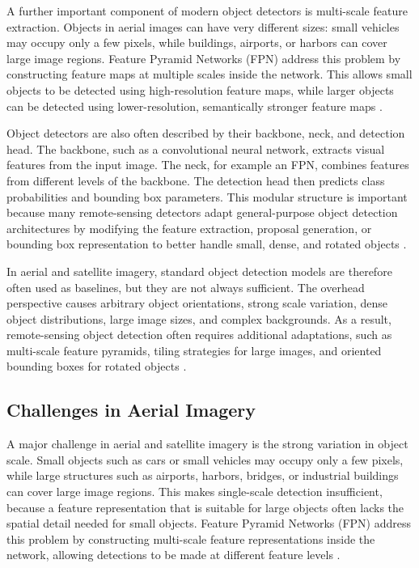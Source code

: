 A further important component of modern object detectors is multi-scale feature extraction. Objects in aerial images can have very different sizes: small vehicles may occupy only a few pixels, while buildings, airports, or harbors can cover large image regions. Feature Pyramid Networks (FPN) address this problem by constructing feature maps at multiple scales inside the network. This allows small objects to be detected using high-resolution feature maps, while larger objects can be detected using lower-resolution, semantically stronger feature maps \cite{lin2017feature,ding2021object}.

Object detectors are also often described by their backbone, neck, and detection head. The backbone, such as a convolutional neural network, extracts visual features from the input image. The neck, for example an FPN, combines features from different levels of the backbone. The detection head then predicts class probabilities and bounding box parameters. This modular structure is important because many remote-sensing detectors adapt general-purpose object detection architectures by modifying the feature extraction, proposal generation, or bounding box representation to better handle small, dense, and rotated objects \cite{li2020object,ding2021object}.

In aerial and satellite imagery, standard object detection models are therefore often used as baselines, but they are not always sufficient. The overhead perspective causes arbitrary object orientations, strong scale variation, dense object distributions, large image sizes, and complex backgrounds. As a result, remote-sensing object detection often requires additional adaptations, such as multi-scale feature pyramids, tiling strategies for large images, and oriented bounding boxes for rotated objects \cite{ding2021object,lam2018xview}.

\subsection{Challenges in Aerial Imagery}

A major challenge in aerial and satellite imagery is the strong variation in object scale. Small objects such as cars or small vehicles may occupy only a few pixels, while large structures such as airports, harbors, bridges, or industrial buildings can cover large image regions. This makes single-scale detection insufficient, because a feature representation that is suitable for large objects often lacks the spatial detail needed for small objects. Feature Pyramid Networks (FPN) address this problem by constructing multi-scale feature representations inside the network, allowing detections to be made at different feature levels \cite{ding2021object,lam2018xview,lin2017feature}.

